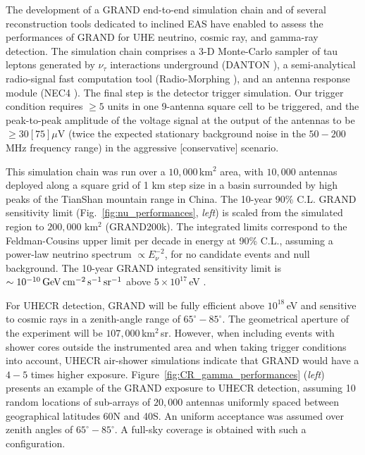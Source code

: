 \documentclass[a4paper,11pt]{article}
\begin{document}
The development of a GRAND end-to-end simulation chain and of several reconstruction tools dedicated to inclined EAS have enabled to assess the performances of GRAND for UHE neutrino, cosmic ray, and gamma-ray detection. The simulation chain comprises a 3-D Monte-Carlo sampler of tau leptons generated by $\nu_\tau$ interactions underground (DANTON \cite{DANTON:note}), a semi-analytical radio-signal fast computation tool (Radio-Morphing \cite{Zilles20_RM,Chiche_ICRC21}), and an antenna response module (NEC4 \cite{NEC4}). The final step is the detector trigger simulation. Our trigger condition requires $\ge 5$ units in one 9-antenna square cell to be triggered, and the peak-to-peak amplitude of the voltage signal at the output of the antennas to be $\ge 30 [75] \mu$V (twice the expected stationary background noise in the $50-200$\,MHz frequency range) in the aggressive [conservative] scenario. 

This simulation chain was run over a $10,000$\,km$^2$ area, with $10,000$ antennas deployed along a square grid of 1 km step size in a basin surrounded by high peaks of the TianShan mountain range in China. The 10-year 90\% C.L. GRAND sensitivity limit (Fig.~\ref{fig:nu_performances}, {\it left}) is scaled from the simulated region to $200,000$ km$^2$ (GRAND200k). The integrated limits correspond to the Feldman-Cousins upper limit per decade in energy at 90\% C.L., assuming a power-law neutrino spectrum $\propto E_{\nu}^{-2}$, for no candidate events and null background. The 10-year GRAND integrated sensitivity limit is $\sim 10^{-10}\,{\rm GeV}\,{\rm cm}^{-2}\,{\rm s}^{-1}\,{\rm sr}^{-1}$ above $5\times 10^{17}$\,eV \cite{GRAND20}. 

For UHECR detection, GRAND will be fully efficient above $10^{18}$\,eV and sensitive to cosmic rays in a zenith-angle range of $65^\circ-85^\circ$. The geometrical aperture of the experiment will be $107,000\,$km$^2$\,sr. However, when including events with shower cores outside the instrumented area and when taking trigger conditions into account, UHECR air-shower simulations indicate that GRAND would have a $4-5$ times higher exposure. Figure~\ref{fig:CR_gamma_performances} ({\it left}) presents an example of the GRAND exposure to UHECR detection, assuming 10 random locations of sub-arrays of $20,000$ antennas uniformly spaced between geographical latitudes 60N and 40S. An uniform acceptance was assumed over zenith angles of $65^\circ-85^\circ$. A full-sky coverage is obtained with such a configuration.
\end{document}
